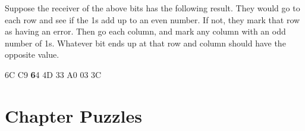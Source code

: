 Suppose the receiver of the above bits has the following result. They would go to each row and see if the 1s add up to an even number. If not, they mark that row as having an error. Then go each column, and mark any column with an odd number of 1s. Whatever bit ends up at that row and column should have the opposite value.

\begin{center}6C C9 \textbf{6}4 4D 33 A0 03 3C\end{center}

\begin{center}\end{center}


\section{Chapter Puzzles}

